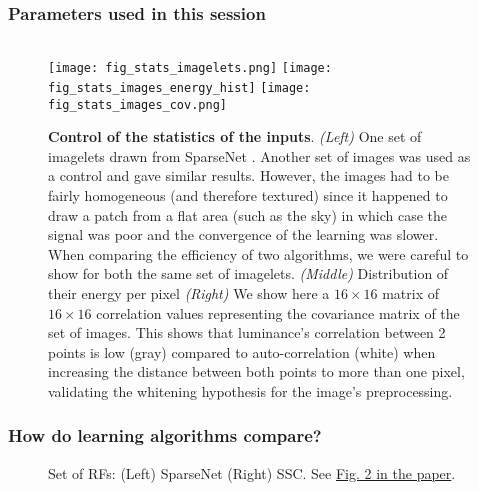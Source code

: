 \documentclass[a4]{beamer}%
\begin{document}
\begin{frame}
\frametitle{Parameters used in this session}%
\begin{center}
{\tiny
\begin{tabular}{l|l}

\end{tabular}
}
\end{center}
\end{frame}
\begin{frame}
\begin{figure}
\texttt{[image: fig\_stats\_imagelets.png]}%
\texttt{[image: fig\_stats\_images\_energy\_hist]}%
\texttt{[image: fig\_stats\_images\_cov.png]}%
\caption{ {\tiny\textbf{Control of the statistics of the inputs}. {\it (Left)} One set of imagelets drawn from SparseNet . Another set of images was used as a control and gave similar results. However, the images had to be fairly homogeneous (and therefore textured) since it happened to draw a patch from a flat area (such as the sky) in which case the signal was poor and the convergence of the learning was slower. When comparing the efficiency of two algorithms, we were careful to show for both the same set of imagelets. {\it (Middle)} Distribution of their energy per pixel  {\it (Right)} We show here a $16\times 16$ matrix of $16\times 16$ correlation values representing the covariance matrix of the set of images. This shows that luminance's correlation between 2 points is low (gray) compared to auto-correlation (white) when increasing the distance between both points to more than one pixel, validating the whitening hypothesis for the image's preprocessing.}}%
\label{fig:white}%
\end{figure}
\end{frame}
\begin{frame}\frametitle{How do learning algorithms compare?}%
\begin{figure}
%
%

\caption{Set of RFs:  (Left) SparseNet (Right) SSC. See \href{http://www.incm.cnrs-mrs.fr/LaurentPerrinet/Figures/Perrinet10shl/FigureDeux}{Fig. 2 in the paper}.  }%
\end{figure}%
\end{frame}
\end{document}
